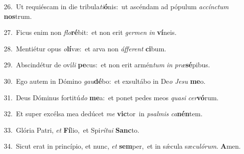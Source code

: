 {\numbfont\textcolor{\numbcolor}{26.}}~Ut requiéscam in die tribula\-\textit{ti}\-\textbf{ó}nis:~\star ut ascéndam ad pópulum \textit{ac}\-\textit{cínc}\textit{tum} \textbf{nos}\-trum.\par
{\numbfont\textcolor{\numbcolor}{27.}}~Ficus enim non \textit{flo}\-\textbf{ré}bit:~\star et non erit \textit{ger}\-\textit{men} \textit{in} \textbf{ví}\-neis.\par
{\numbfont\textcolor{\numbcolor}{28.}}~Mentiétur opus \textit{o}\-\textbf{lí}væ:~\star et arva non \textit{áf}\-\textit{fe}\textit{rent} \textbf{ci}\-bum.\par
{\numbfont\textcolor{\numbcolor}{29.}}~Abscindétur de oví\textit{li} \textbf{pe}\-cus:~\star et non erit armén\textit{tum} \textit{in} \textit{præ}\-\textbf{sé}pibus.\par
{\numbfont\textcolor{\numbcolor}{30.}}~Ego autem in Dómino \textit{gau}\-\textbf{dé}bo:~\star et exsultábo in De\textit{o} \textit{Je}\-\textit{su} \textbf{me}\-o.\par
{\numbfont\textcolor{\numbcolor}{31.}}~Deus Dóminus fortitú\textit{do} \textbf{me}\-a:~\star et ponet pedes meos \textit{qua}\-\textit{si} \textit{cer}\-\textbf{vó}rum.\par
{\numbfont\textcolor{\numbcolor}{32.}}~Et super excélsa mea dedúcet \textit{me} \textbf{vic}\-tor~\star in \textit{psal}\-\textit{mis} \textit{ca}\-\textbf{nén}tem.\par
{\numbfont\textcolor{\numbcolor}{33.}}~Glória Patri, \textit{et} \textbf{Fí}\-lio,~\star et Spi\-\textit{rí}\-\textit{tu}\textit{i} \textbf{Sanc}\-to.\par
{\numbfont\textcolor{\numbcolor}{34.}}~Sicut erat in princípio, et nunc, \textit{et} \textbf{sem}\-per,~\star et in sǽcula sæ\-\textit{cu}\-\textit{ló}\textit{rum}. \textbf{A}\-men.\par

